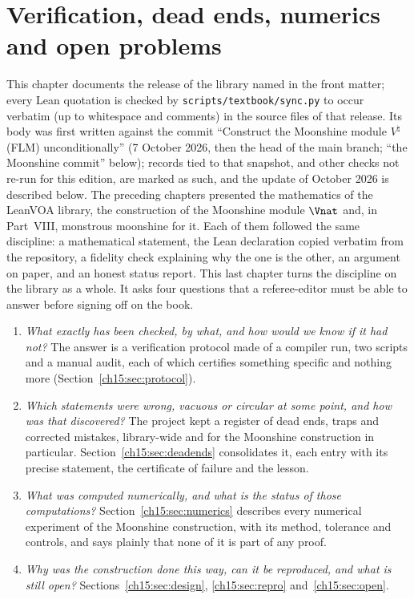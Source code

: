\chapter{Verification, dead ends, numerics and open problems}\label{ch:15}

\providecommand{\chXVsq}{\mathbin{\ltimes}}

This chapter documents the release of the library named in the front matter; every Lean quotation is checked by \texttt{scripts/textbook/sync.py} to occur verbatim (up to whitespace and
comments) in the source files of that release. Its body was first written against the commit ``Construct the
Moonshine module $V^\natural$ (FLM) unconditionally'' (7 October 2026, then the head of the main branch; ``the Moonshine
commit'' below); records tied to that snapshot, and other checks not re-run for this edition, are marked as such, and the
update of October 2026 is described below. The
preceding chapters presented the mathematics of the LeanVOA library, the construction of the Moonshine module
$\Vnat$ and, in Part~VIII, monstrous moonshine for it. Each of them followed the same
discipline: a mathematical statement, the Lean declaration copied verbatim from the repository, a
fidelity check explaining why the one is the other, an argument on paper, and an honest status
report. This last chapter turns the discipline on the library as a whole. It asks four questions
that a referee-editor must be able to answer before signing off on the book.

\begin{enumerate}[label=(\arabic*)]
\item \emph{What exactly has been checked, by what, and how would we know if it had not?} The
  answer is a verification protocol made of a compiler run, two scripts and a manual audit, each
  of which certifies something specific and nothing more (Section~\ref{ch15:sec:protocol}).
\item \emph{Which statements were wrong, vacuous or circular at some point, and how was that
  discovered?} The project kept a register of dead ends, traps and corrected mistakes, library-wide
  and for the Moonshine construction in particular. Section~\ref{ch15:sec:deadends} consolidates
  it, each entry with its precise statement, the certificate of failure and the lesson.
\item \emph{What was computed numerically, and what is the status of those computations?}
  Section~\ref{ch15:sec:numerics} describes every numerical experiment of the Moonshine
  construction, with its method, tolerance and controls, and says plainly that none of it is part
  of any proof.
\item \emph{Why was the construction done this way, can it be reproduced, and what is still
  open?} Sections~\ref{ch15:sec:design}, \ref{ch15:sec:repro} and~\ref{ch15:sec:open}.
\end{enumerate}

